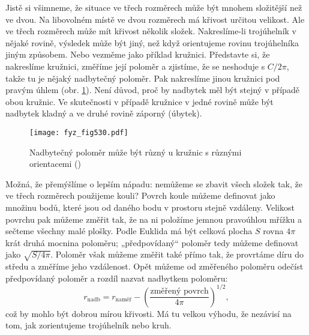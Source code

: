 {    Jistě si všimneme, že situace ve třech rozměrech může být mnohem složitější než ve dvou. Na 
    libovolném místě ve dvou rozměrech má křivost určitou velikost. Ale ve třech rozměrech může mít 
    křivost několik složek. Nakreslíme-li trojúhelník v nějaké rovině, výsledek může být jiný, než 
    když orientujeme rovinu trojúhelníka jiným způsobem. Nebo vezměme jako příklad kružnici. 
    Představte si, že nakreslíme kružnici, změříme její poloměr a zjistíme, že se neshoduje s 
    \(C/2\pi\), takže tu je nějaký nadbytečný poloměr. Pak nakreslíme jinou kružnici pod pravým 
    úhlem (obr. \ref{fyz:fig530}). Není důvod, proč by nadbytek měl být stejný v případě obou 
    kružnic. Ve skutečnosti v případě kružnice v jedné rovině může být nadbytek kladný a ve druhé 
    rovině záporný (úbytek).
    
    \begin{figure}[ht!] %
      \centering
      \texttt{[image: fyz\_fig530.pdf]}
      \caption{Nadbytečný poloměr může být různý u kružnic s různými orientacemi      
               (\cite[s.~782]{Feynman02})}
      \label{fyz:fig530}
    \end{figure}
    
    Možná, že přemýšlíme o lepším nápadu: nemůžeme se zbavit všech složek tak, že ve třech 
    rozměrech použijeme kouli? Povrch koule můžeme definovat jako množinu bodů, které jsou od 
    daného bodu v prostoru stejně vzdáleny. Velikost povrchu pak můžeme změřit tak, že na ni 
    položíme jemnou pravoúhlou mřížku a sečteme všechny malé plošky. Podle Euklida má být celková 
    plocha \(S\) rovna \(4\pi\) krát druhá mocnina poloměru; „předpovídaný“ poloměr tedy můžeme 
    definovat jako \(\sqrt{S/4\pi}\). Poloměr však můžeme změřit také přímo tak, že provrtáme díru 
    do středu a změříme jeho vzdálenost. Opět můžeme od změřeného poloměru odečíst předpovídaný 
    poloměr a rozdíl nazvat nadbytkem poloměru:
    \begin{equation*}
      r_{\text{nadb}} = r_{\text{naměř}} -\left(\dfrac{\text{změřený povrch}}{4\pi}\right)^{1/2},
    \end{equation*}
    což by mohlo být dobrou mírou křivosti. Má tu velkou výhodu, že nezávisí na tom, jak 
    zorientujeme trojúhelník nebo kruh.
    
}
